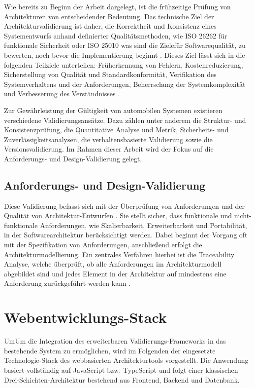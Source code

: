Wie bereits zu Beginn der Arbeit dargelegt, ist die frühzeitige Prüfung von Architekturen von entscheidender Bedeutung. Das technische Ziel der Architekturvalidierung ist daher, die Korrektheit und Konsistenz eines Systementwurfs anhand definierter Qualitätsmethoden, wie  ISO 26262 für funktionale Sicherheit oder ISO 25010 was sind die Zielefür Softwarequalität, zu bewerten, noch bevor die Implementierung beginnt \cite{venkitachalam2015}. Dieses Ziel lässt sich in die folgenden Teilziele unterteilen: Früherkennung von Fehlern, Kostenreduzierung, Sicherstellung von Qualität und Standardkonformität, Verifikation des Systemverhaltens und der Anforderungen, Beherrschung der Systemkomplexität und Verbesserung des Verständnisses\cite{venkitachalam2015} \cite{kang2019formal} \cite{bucher2019crosslayera}.

Zur Gewährleistung der Gültigkeit von automobilen Systemen existieren verschiedene Validierungsansätze. Dazu zählen unter anderem die Struktur- und Konsistenzprüfung,  die Quantitative Analyse und Metrik, Sicherheits- und Zuverlässigkeitsanalysen, die verhaltensbasierte Validierung sowie die Versionsvalidierung. Im Rahmen dieser Arbeit wird der Fokus auf die Anforderungs- und Design-Validierung gelegt.

\subsection*{Anforderungs- und Design-Validierung}

Diese Validierung befasst sich mit der Überprüfung von Anforderungen und der Qualität von Architektur-Entwürfen \cite{ahrens2013objective}\cite{knieke2022managed}. Sie stellt sicher, dass funktionale und nicht-funktionale Anforderungen, wie Skalierbarkeit, Erweiterbarkeit und Portabilität, in der Softwarearchitektur berücksichtigt werden. Dabei beginnt der Vorgang oft mit der Spezifikation von Anforderungen, anschließend erfolgt die Architekturmodellierung. Ein zentrales Verfahren hierbei ist die Traceability Analyse, welche überprüft, ob alle Anforderungen im Architekturmodell abgebildet sind und jedes Element in der Architektur auf mindestens eine Anforderung zurückgeführt werden kann \cite{vogel2021metrics}.

\section{Webentwicklungs-Stack}

UmUm die Integration des erweiterbaren Validierungs-Frameworks in das bestehende System zu ermöglichen, wird im Folgenden der eingesetzte Technologie-Stack des webbasierten Architekturtools vorgestellt. Die Anwendung basiert vollständig auf JavaScript bzw. TypeScript und folgt einer klassischen Drei-Schichten-Architektur bestehend aus Frontend, Backend und Datenbank.

